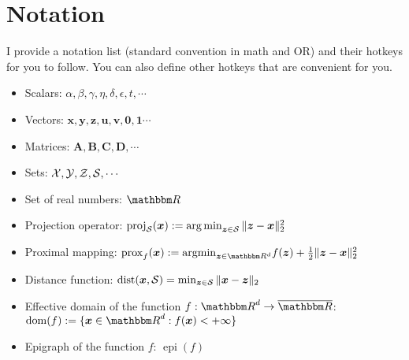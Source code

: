 \documentclass{article}
\newcommand{\bbm}{\mathbbm}
\def\bA{{\mathbf{A}}}
\def\bB{{\mathbf{B}}}
\def\bC{{\mathbf{C}}}
\def\bD{{\mathbf{D}}}
\def\cS{{\cal S}}
\def\cX{{\cal X}}
\def\cY{{\cal Y}}
\def\cZ{{\cal Z}}
\def\u{{\bm u}}
\def\v{\bm{v}}
\def\x{{\bm x}}
\def\y{\bm{y}}
\def\z{\bm{z}}
\def\bz{{\mathbf 0}}
\def\1{{\mathbf 1}}
\def\prox{{\rm{prox}}}
\def\dist{{\operatorname{dist}}}
\DeclareMathOperator{\dom}{dom}
\DeclareMathOperator{\epi}{epi}
\DeclareMathOperator{\argmin}{argmin}
\DeclareMathOperator{\proj}{proj}
\begin{document}
\section{Notation}
I provide a notation list (standard convention in math and OR) and their hotkeys for you to follow. You can also define other hotkeys that are convenient for you. 



\begin{itemize}
    \item  Scalars: $\alpha,\beta,\gamma, \eta, \delta, \epsilon, t,\cdots$
    \item Vectors: $\x,\y,\z,\u,\v, \bz,\1\cdots$
    \item Matrices: $\bA,\bB,\bC,\bD,\cdots$
    \item Sets: $\cX,\cY,\cZ,\cS,\cdots$
    \item Set of real numbers: $\bbm R$
    \item Projection operator: $\proj_{\cS}(\x) :=\mathop{\arg\min}_{\z\in\cS}\|\z-\x\|_2^2$
    \item Proximal mapping: $\prox_f(\x):={\argmin}_{\z\in{\bbm R^d}} f(\z)+ \frac{1}{2}\|\z-\x\|_2^2$
    \item Distance function: $\dist(\x,\cS) = \min_{\z\in\cS}\|\x-\z\|_2$
    \item Effective domain of the function $f:{\bbm R}^d\rightarrow \overline{\bbm R}$: $\dom(f):=\{\x\in{\bbm R}^d: f(\x)<+\infty\}$
    \item  Epigraph of the function  $f$: $\epi(f)$
\end{itemize}

 
  
\end{document}
